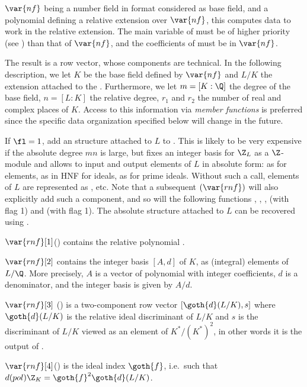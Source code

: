 \label{se:rnfinit}
$\var{nf}$ being a number field in 
format considered as base field, and  a polynomial defining a relative
extension over $\var{nf}$, this computes data to work in the
relative extension. The main variable of  must be of higher priority
(see ) than that of $\var{nf}$, and the coefficients of
 must be in $\var{nf}$.

The result is a row vector, whose components are technical. In the following
description, we let $K$ be the base field defined by $\var{nf}$ and $L/K$
the extension attached to the . Furthermore, we let
$m = [K:\Q]$ the degree of the base field, $n = [L:K]$ the relative degree,
$r_1$ and $r_2$ the number of real and complex places of $K$. Access to this
information via \emph{member functions} is preferred since the specific
data organization specified below will change in the future.

If $\fl = 1$, add an  structure attached to $L$ to .
This is likely to be very expensive if the absolute degree $mn$ is large,
but fixes an integer basis for $\Z_L$ as a $\Z$-module and allows to input
and output elements of $L$ in absolute form: as  for elements,
as  in HNF for ideals, as  for prime ideals. Without such
a call, elements of $L$ are represented as , etc.
Note that a subsequent $(\var{rnf})$ will also explicitly
add such a component, and so will the following functions ,
, ,  (with flag 1)
and  (with flag 1). The absolute  structure
attached to $L$ can be recovered using .

$\var{rnf}[1]$() contains the relative polynomial .

$\var{rnf}[2]$ contains the integer basis $[A,d]$ of $K$, as
(integral) elements of $L/\Q$. More precisely, $A$ is a vector of
polynomial with integer coefficients, $d$ is a denominator, and the integer
basis is given by $A/d$.

$\var{rnf}[3]$ () is a two-component row vector
$[\goth{d}(L/K),s]$ where $\goth{d}(L/K)$ is the relative ideal discriminant
of $L/K$ and $s$ is the discriminant of $L/K$ viewed as an element of
$K^*/(K^*)^2$, in other words it is the output of .

$\var{rnf}[4]$() is the ideal index $\goth{f}$, i.e.~such
that $d(pol)\Z_K=\goth{f}^2\goth{d}(L/K)$.

